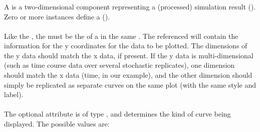 \subsubsection{}
\label{class:curve}
A \Curve is a two-dimensional \Output component representing a (processed) simulation result (). Zero or more \Curve instances define a \PlotTwo (). 

\begin{blockChanged}
\paragraph*{}
Like the , the  must be the  of a \DataGenerator in the same \SedDocument.  The referenced \DataGenerator will contain the information for the y coordinates for the data to be plotted.  The dimensions of the y data should match the x data, if present.  If the y data is multi-dimensional (such as time course data over several stochastic replicates), one dimension should match the x data (time, in our example), and the other dimension should simply be replicated as separate curves on the same plot (with the same style and label).

\paragraph*{}
The optional  attribute is of type \CurveType, and determines the kind of curve being displayed.  The possible values are:


\end{blockChanged}
